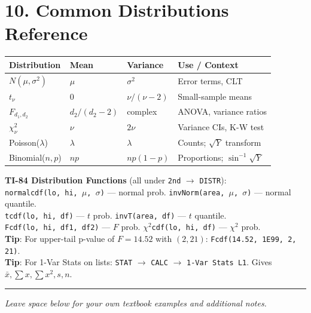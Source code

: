 \documentclass[9pt,letterpaper]{article}
\begin{document}
\section{10. Common Distributions Reference}

\begin{center}\small
\begin{tabular}{@{}llll@{}}
\toprule
Distribution & Mean & Variance & Use / Context \\
\midrule
$N(\mu, \sigma^2)$ & $\mu$ & $\sigma^2$ & Error terms, CLT \\
$t_\nu$ & 0 & $\nu/(\nu-2)$ & Small-sample means \\
$F_{d_1, d_2}$ & $d_2/(d_2-2)$ & complex & ANOVA, variance ratios \\
$\chi^2_\nu$ & $\nu$ & $2\nu$ & Variance CIs, K-W test \\
Poisson($\lambda$) & $\lambda$ & $\lambda$ & Counts; $\sqrt{Y}$ transform \\
Binomial($n,p$) & $np$ & $np(1-p)$ & Proportions; $\sin^{-1}\!\sqrt{Y}$ \\
\bottomrule
\end{tabular}
\end{center}

\begin{calcbox}
\textbf{TI-84 Distribution Functions} (all under \texttt{2nd} $\to$ \texttt{DISTR}):\\
\texttt{normalcdf(lo, hi, $\mu$, $\sigma$)} --- normal prob. \quad \texttt{invNorm(area, $\mu$, $\sigma$)} --- normal quantile.\\
\texttt{tcdf(lo, hi, df)} --- $t$ prob. \quad \texttt{invT(area, df)} --- $t$ quantile.\\
\texttt{Fcdf(lo, hi, df1, df2)} --- $F$ prob. \quad \texttt{$\chi^2$cdf(lo, hi, df)} --- $\chi^2$ prob.\\
\textbf{Tip}: For upper-tail p-value of $F=14.52$ with $(2,21)$: \texttt{Fcdf(14.52, 1E99, 2, 21)}.\\
\textbf{Tip}: For 1-Var Stats on lists: \texttt{STAT} $\to$ \texttt{CALC} $\to$ \texttt{1-Var Stats L1}. Gives $\bar{x}, \sum x, \sum x^2, s, n$.
\end{calcbox}

\vspace{4pt}
\hrule
\vspace{2pt}
\begin{center}
\small\textit{Leave space below for your own textbook examples and additional notes.}
\end{center}
\vfill
\end{document}

